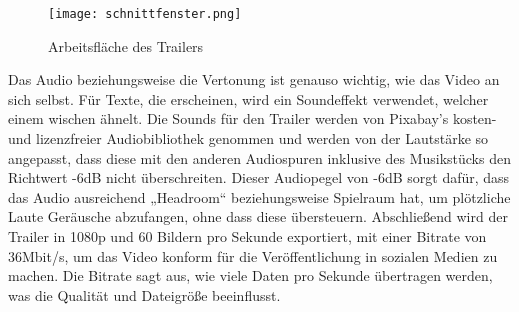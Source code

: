 \begin{figure}[H]
    \centering
    \texttt{[image: schnittfenster.png]}
    \caption{Arbeitsfläche des Trailers}
\end{figure}

Das Audio beziehungsweise die Vertonung ist genauso wichtig, wie das Video an sich selbst. Für Texte, die erscheinen, wird ein Soundeffekt verwendet, welcher einem wischen ähnelt. Die Sounds für den Trailer werden von Pixabay’s kosten- und lizenzfreier Audiobibliothek genommen und werden von der Lautstärke so angepasst, dass diese mit den anderen Audiospuren inklusive des Musikstücks den Richtwert -6dB nicht überschreiten. Dieser Audiopegel von -6dB sorgt dafür, dass das Audio ausreichend „Headroom“ beziehungsweise Spielraum hat, um plötzliche Laute Geräusche abzufangen, ohne dass diese übersteuern. Abschließend wird der Trailer in 1080p und 60 Bildern pro Sekunde exportiert, mit einer Bitrate von 36Mbit/s, um das Video konform für die Veröffentlichung in sozialen Medien zu machen. Die Bitrate sagt aus, wie viele Daten pro Sekunde übertragen werden, was die Qualität und Dateigröße beeinflusst.



\renewcommand{\kapitelautor}{}
